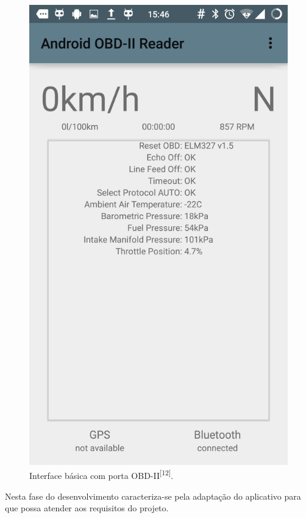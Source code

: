 \begin{figure}[hp]
    \centering
    
    \includegraphics[scale=0.3]{figures/git_obd_interface.png}
    
    \caption{Interface básica com porta OBD-II\textsuperscript{[12]}.}
    
    \label{fig:git_obd_interface}
\end{figure}

Nesta fase do desenvolvimento caracteriza-se pela adaptação do aplicativo para que possa atender aos requisitos do projeto.

